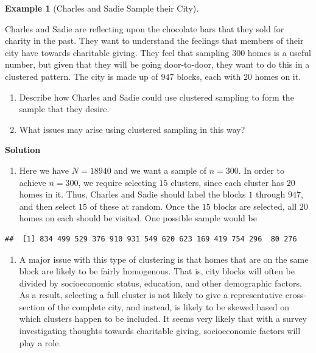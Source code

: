 \documentclass[
  letterpaper,
  DIV=11,
  numbers=noendperiod]{scrreprt}
\providecommand{\tightlist}{%
  \setlength{\itemsep}{0pt}\setlength{\parskip}{0pt}}\usepackage{longtable,booktabs,array}
\theoremstyle{definition}
\theoremstyle{definition}
\newtheorem{example}{Example}[chapter]
\theoremstyle{definition}
\theoremstyle{remark}
\begin{document}
\begin{example}[Charles and Sadie Sample their
City]\protect\hypertarget{exm-clustered-sample}{}\label{exm-clustered-sample}

Charles and Sadie are reflecting upon the chocolate bars that they sold
for charity in the past. They want to understand the feelings that
members of their city have towards charitable giving. They feel that
sampling \(300\) homes is a useful number, but given that they will be
going door-to-door, they want to do this in a clustered pattern. The
city is made up of \(947\) blocks, each with \(20\) homes on it.

\begin{enumerate}
\def\labelenumi{\alph{enumi}.}
\tightlist
\item
  Describe how Charles and Sadie could use clustered sampling to form
  the sample that they desire.
\item
  What issues may arise using clustered sampling in this way?
\end{enumerate}

\begin{tcolorbox}[enhanced jigsaw, colback=white, colframe=quarto-callout-color-frame, arc=.35mm, leftrule=.75mm, rightrule=.15mm, opacityback=0, breakable, bottomrule=.15mm, left=2mm, toprule=.15mm]

\vspace{-3mm}\textbf{Solution}\vspace{3mm}

\begin{enumerate}
\def\labelenumi{\alph{enumi}.}
\tightlist
\item
  Here we have \(N=18940\) and we want a sample of \(n=300\). In order
  to achieve \(n=300\), we require selecting \(15\) clusters, since each
  cluster has \(20\) homes in it. Thus, Charles and Sadie should label
  the blocks \(1\) through \(947\), and then select \(15\) of these at
  random. Once the \(15\) blocks are selected, all \(20\) homes on each
  should be visited. One possible sample would be
\end{enumerate}

\begin{verbatim}
##  [1] 834 499 529 376 910 931 549 620 623 169 419 754 296  80 276
\end{verbatim}

\begin{enumerate}
\def\labelenumi{\alph{enumi}.}
\setcounter{enumi}{1}
\tightlist
\item
  A major issue with this type of clustering is that homes that are on
  the same block are likely to be fairly homogenous. That is, city
  blocks will often be divided by socioeconomic status, education, and
  other demographic factors. As a result, selecting a full cluster is
  not likely to give a representative cross-section of the complete
  city, and instead, is likely to be skewed based on which clusters
  happen to be included. It seems very likely that with a survey
  investigating thoughts towards charitable giving, socioeconomic
  factors will play a role.
\end{enumerate}


\end{tcolorbox}
\end{example}
\end{document}
